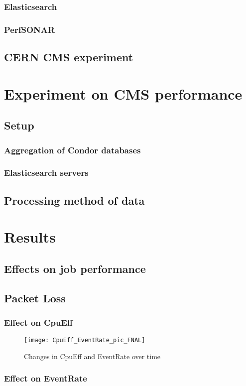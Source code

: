 \documentclass[]{article}
\begin{document}
\subsubsection{Elasticsearch}
\subsubsection{PerfSONAR}
\subsection{CERN CMS experiment}
\section{Experiment on CMS performance}
\subsection{Setup}
\subsubsection{Aggregation of Condor databases}
\subsubsection{Elasticsearch servers}
\subsection{Processing method of data}
\section{Results}
\subsection{Effects on job performance}
\subsection{Packet Loss}
\subsubsection{Effect on CpuEff}
\begin{figure}
	\caption{Changes in CpuEff and EventRate over time}
	\centering
	\texttt{[image: CpuEff\_EventRate\_pic\_FNAL]}
\end{figure}

\subsubsection{Effect on EventRate}
\end{document}

